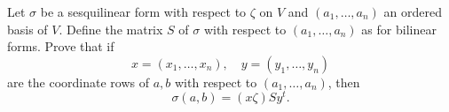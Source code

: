 Let $\sigma$ be a sesquilinear form with respect to $\zeta$ on $V$ and $(a_1, \ldots, a_n)$ an ordered basis of $V$. Define the matrix $S$ of $\sigma$ with respect to $(a_1, \ldots, a_n)$ as for bilinear forms. Prove that if
$$x = (x_1, \ldots, x_n), \quad y = (y_1, \ldots, y_n)$$
are the coordinate rows of $a, b$ with respect to $(a_1, \ldots, a_n)$, then
$$\sigma(a, b) = (x\zeta)Sy^t.$$
